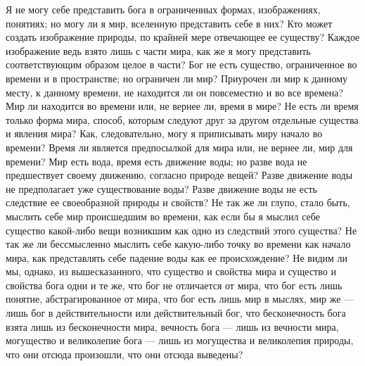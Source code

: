 \documentclass[12pt]{article}
\begin{document}
Я не могу себе представить бога в ограниченных формах, изображениях, понятиях; но могу ли я мир, вселенную представить себе в них? Кто может создать изображение природы, по крайней мере отвечающее ее существу? Каждое изображение ведь взято лишь с части мира, как же я могу представить соответствующим образом целое в части? Бог не есть существо, ограниченное во времени и в пространстве; но ограничен ли мир? Приурочен ли мир к данному месту, к данному времени, не находится ли он повсеместно и во все времена? Мир ли находится во времени или, не вернее ли, время в мире? Не есть ли время только форма мира, способ, которым следуют друг за другом отдельные существа и явления мира? Как, следовательно, могу я приписывать миру начало во времени? Время ли является предпосылкой для мира или, не вернее ли, мир для времени? Мир есть вода, время есть движение воды; но разве вода не предшествует своему движению, согласно природе вещей? Разве движение воды не предполагает уже существование воды? Разве движение воды не есть следствие ее своеобразной природы и свойств? Не так же ли глупо, стало быть, мыслить себе мир происшедшим во времени, как если бы я мыслил себе существо какой-либо вещи возникшим как одно из следствий этого существа? Не так же ли бессмысленно мыслить себе какую-либо точку во времени как начало мира, как представлять себе падение воды как ее происхождение? Не видим ли мы, однако, из вышесказанного, что существо и свойства мира и существо и свойства бога одни и те же, что бог не отличается от мира, что бог есть лишь понятие, абстрагированное от мира, что бог есть лишь мир в мыслях, мир же --- лишь бог в действительности или действительный бог, что бесконечность бога взята лишь из бесконечности мира, вечность бога --- лишь из вечности мира, могущество и великолепие бога --- лишь из могущества и великолепия природы, что они отсюда произошли, что они отсюда выведены? 
\end{document}
